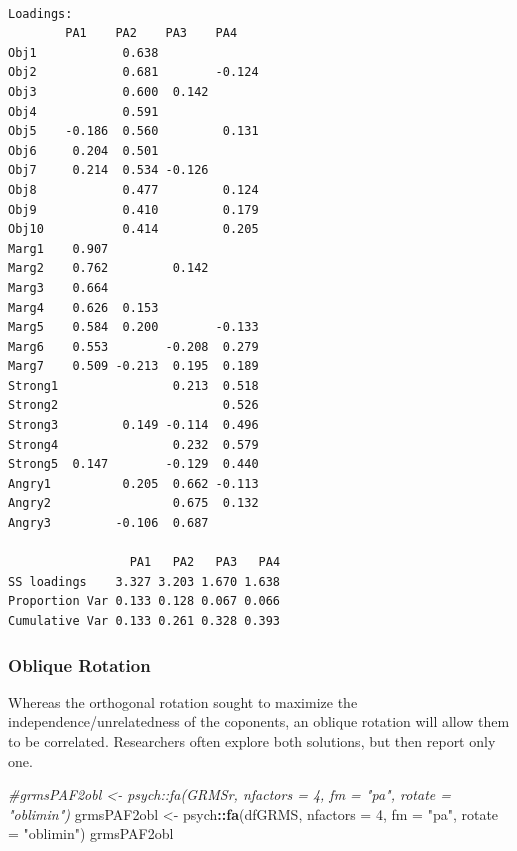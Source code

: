 \documentclass[
  english,
]{book}
\newenvironment{Shaded}{\begin{snugshade}}{\end{snugshade}}
\newcommand{\CommentTok}[1]{\textcolor[rgb]{0.56,0.35,0.01}{\textit{#1}}}
\newcommand{\DataTypeTok}[1]{\textcolor[rgb]{0.13,0.29,0.53}{#1}}
\newcommand{\DecValTok}[1]{\textcolor[rgb]{0.00,0.00,0.81}{#1}}
\newcommand{\KeywordTok}[1]{\textcolor[rgb]{0.13,0.29,0.53}{\textbf{#1}}}
\newcommand{\NormalTok}[1]{#1}
\newcommand{\OperatorTok}[1]{\textcolor[rgb]{0.81,0.36,0.00}{\textbf{#1}}}
\newcommand{\StringTok}[1]{\textcolor[rgb]{0.31,0.60,0.02}{#1}}
\begin{document}
\begin{verbatim}

Loadings:
        PA1    PA2    PA3    PA4   
Obj1            0.638              
Obj2            0.681        -0.124
Obj3            0.600  0.142       
Obj4            0.591              
Obj5    -0.186  0.560         0.131
Obj6     0.204  0.501              
Obj7     0.214  0.534 -0.126       
Obj8            0.477         0.124
Obj9            0.410         0.179
Obj10           0.414         0.205
Marg1    0.907                     
Marg2    0.762         0.142       
Marg3    0.664                     
Marg4    0.626  0.153              
Marg5    0.584  0.200        -0.133
Marg6    0.553        -0.208  0.279
Marg7    0.509 -0.213  0.195  0.189
Strong1                0.213  0.518
Strong2                       0.526
Strong3         0.149 -0.114  0.496
Strong4                0.232  0.579
Strong5  0.147        -0.129  0.440
Angry1          0.205  0.662 -0.113
Angry2                 0.675  0.132
Angry3         -0.106  0.687       

                 PA1   PA2   PA3   PA4
SS loadings    3.327 3.203 1.670 1.638
Proportion Var 0.133 0.128 0.067 0.066
Cumulative Var 0.133 0.261 0.328 0.393
\end{verbatim}

\hypertarget{oblique-rotation-1}{%
\subsubsection{Oblique Rotation}\label{oblique-rotation-1}}

Whereas the orthogonal rotation sought to maximize the independence/unrelatedness of the coponents, an oblique rotation will allow them to be correlated. Researchers often explore both solutions, but then report only one.

\begin{Shaded}
\begin{Highlighting}[]
\CommentTok{#grmsPAF2obl <- psych::fa(GRMSr, nfactors = 4, fm = "pa", rotate = "oblimin")}
\NormalTok{grmsPAF2obl <-}\StringTok{ }\NormalTok{psych}\OperatorTok{::}\KeywordTok{fa}\NormalTok{(dfGRMS, }\DataTypeTok{nfactors =} \DecValTok{4}\NormalTok{, }\DataTypeTok{fm =} \StringTok{"pa"}\NormalTok{, }\DataTypeTok{rotate =} \StringTok{"oblimin"}\NormalTok{)}
\NormalTok{grmsPAF2obl}
\end{Highlighting}
\end{Shaded}
\end{document}
